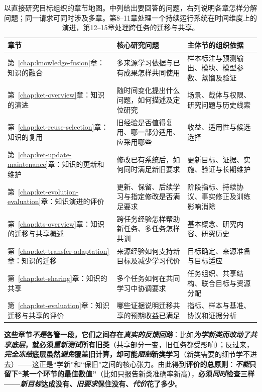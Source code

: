 \begin{table}[htbp]
  \centering
  \small
  \begin{tabularx}{\linewidth}{@{}p{52mm}XX@{}}
    \toprule
    章节 & 核心研究问题 & 主体节的组织依据 \\
    \midrule
    第~\ref{chap:knowledge-fusion}章：知识的融合 & 多来源学习依据与已有成果怎样共同使用 & 样本标注与预测输出、模块、模型参数、蒸馏及验证 \\
    第~\ref{chap:ket-overview}章：知识的演进 & 随时间变化提出什么问题，如何描述及定位研究 & 场景、载体与权限、研究问题与历史线索 \\
    第~\ref{chap:ket-reuse-selection}章：知识的复用 & 旧经验是否值得复用、哪一部分适用、应采用哪些 & 收益、适用性与候选选择 \\
    第~\ref{chap:ket-update-maintenance}章：知识的更新和维护 & 修改已有系统后，如何同时满足新旧要求 & 更新目标、证据、实施、验证与长期维护 \\
    第~\ref{chap:ket-evolution-evaluation}章：知识演进的评价 & 更新、保留、后续学习与指定修改是否满足要求 & 阶段指标、持续协议、事实修正及训练影响消除 \\
    第~\ref{chap:kts-overview}章：知识的迁移与共享概述 & 跨任务经验怎样帮助新任务、多任务怎样共训 & 基本概念、研究内容、研究历史 \\
    第~\ref{chap:ket-transfer-adaptation}章：知识的迁移 & 来源经验如何支持新目标及减少学习代价 & 目标确定、来源准备与目标适应 \\
    第~\ref{chap:ket-sharing}章：知识的共享 & 多个任务如何在共同学习中协调要求 & 任务组织、共享结构、联合目标与资源分配 \\
    第~\ref{chap:ket-evaluation}章：知识迁移与共享的评价 & 哪些证据说明迁移共享的预期收益已满足 & 指标、样本与基准、协议和证据分析 \\
    \bottomrule
  \end{tabularx}
  \caption{以直接研究目标组织的章节地图。中列给出要回答的问题，右列说明各章怎样分解问题；同一请求可同时涉及多章。第8–11章处理一个持续运行系统在时间维度上的演进，第12–15章处理跨任务的迁移与共享。}
  \label{tab:ket-overview-chapters}
\end{table}

\textbf{这些章节\emph{不是}各管一段，它们之间存在\emph{真实的反馈回路}}：比如\textbf{\emph{为学新类而\emph{改动了共享底层}}，就必须\emph{重新测试}所有旧类}（共享部分一变，旧任务都受影响）；反过来，\textbf{\emph{完全冻结}底层虽然\emph{避免}覆盖旧计算，却可能\emph{限制}新类学习}（新类需要的细节学不进去）——这正是“学新”和“保旧”之间的核心张力。由此得到\textbf{评价的总原则}：\textbf{\emph{不能}只留下“某一个环节的最佳数值”}（比如只报告新类准确率新高），\textbf{必须\emph{同时}检查三样——\emph{新目标}达成没有、\emph{旧要求}保住没有、\emph{代价}花了多少}。

